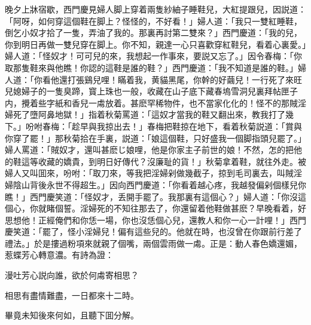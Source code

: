 晚夕上牀宿歇，西門慶見婦人脚上穿着兩隻紗紬子睡鞋兒，大紅提跟兒，因説道：「阿呀，如何穿這個鞋在脚上？怪怪的，不好看！」婦人道：「我只一雙紅睡鞋，倒乞小奴才拾了一隻，弄油了我的。那裏再討第二雙來？」西門慶道：「我的兒，你到明日再做一雙兒穿在脚上。你不知，親達一心只喜歡穿紅鞋兒，看着心裏愛。」婦人道：「怪奴才！可可兒的來，我想起一作事來，要説又忘了。」因令春梅：「你取那隻鞋來與他瞧！你認的這鞋是誰的鞋？」西門慶道：「我不知道是誰的鞋。」婦人道：「你看他還打張鷄兒哩！瞞着我，黄貓黑尾，你幹的好繭兒！一行死了來旺兒媳婦子的一隻臭蹄，寳上珠也一般，收藏在山子底下藏春塢雪洞兒裏拜帖匣子内，攪着些字紙和香兒一䖏放着。甚麽罕稀物件，也不當家化化的！怪不的那賊淫婦死了墮阿鼻地獄！」指着秋菊罵道：「這奴才當我的鞋又翻出來，教我打了幾下。」吩咐春梅：「趁早與我掠出去！」春梅把鞋掠在地下，看着秋菊説道：「賞與你穿了罷！」那秋菊拾在手裏，説道：「娘這個鞋，只好盛我一個脚指頭兒罷了。」婦人罵道：「賊奴才，還叫甚麽じ娘哩，他是你家主子前世的娘！不然，怎的把他的鞋這等收藏的嬌貴，到明日好傳代？沒廉耻的貨！」秋菊拿着鞋，就往外走。被婦人又叫囬來，吩咐：「取刀來，等我把淫婦剁做幾截子，掠到毛司裏去，叫賊淫婦陰山背後永世不得超生。」因向西門慶道：「你看着越心疼，我越發偏剁個樣兒你瞧！」西門慶笑道：「怪奴才，丢開手罷了。我那裏有這個心？」婦人道：「你沒這個心，你就睹個誓。淫婦死的不知往那去了，你還留着他鞋做甚麽？早晚看着，好思想他！正經俺們和你恁一場，你也沒恁個心兒，還教人和你一心一計哩！」西門慶笑道：「罷了，怪小淫婦兒！偏有這些兒的。他就在時，也沒曾在你跟前行差了禮法。」於是摟過粉項來就親了個嘴，兩個雲雨做一䖏。正是：動人春色嬌還媚，惹蝶芳心轉意濃。有詩為證：

\begin{myquote}
漫吐芳心説向誰，欲於何䖏寄相思？

相思有盡情難盡，一日都來十二時。
\end{myquote}

畢竟未知後來何如，且聽下囬分解。

